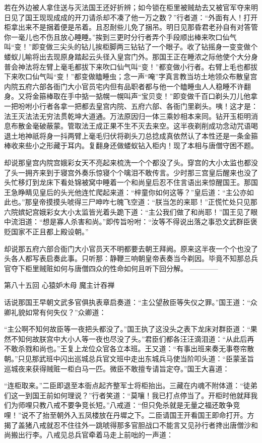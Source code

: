 \documentclass[12pt,UTF8]{ctexbook}
\begin{document}
{	若在外边被人拿住送与灭法国王还好折辨；如今锁在柜里被贼劫去又被官军夺来明日见了国王现现成成的开刀请杀却不凑了他一万之数？”行者道：“外面有人！打开柜拿出来不是捆着便是吊着。且忍耐些儿免了捆吊。明日见那昏君老孙自有对答管你一毫儿也不伤且放心睡睡。”挨到三更时分行者弄个手段顺出棒来吹口仙气叫“变！”即变做三尖头的钻儿挨柜脚两三钻钻了一个眼子。收了钻摇身一变变做个蝼蚁儿睮将出去现原身踏起云头径入皇宫门外。那国王正在睡浓之际他使个大分身普会神法将左臂上毫毛都拔下来吹口仙气叫“变！”都变做小行者。右臂上毛也都拔下来吹口仙气叫“变！”都变做瞌睡虫；念一声“唵”字真言教当坊土地领众布散皇宫内院五府六部各衙门大小官员宅内但有品职者都与他一个瞌睡虫人人稳睡不许翻身。又将金箍棒取在手中掂一掂幌一幌叫声“宝贝变！”即变做千百口剃头刀儿他拿一把吩咐小行者各拿一把都去皇宫内院、五府六部、各衙门里剃头。咦！这才是：法王灭法法无穷法贯乾坤大道通。万法原因归一体三乘妙相本来同。钻开玉柜明消息布散金毫破蔽蒙。管取法王成正果不生不灭去来空。这半夜剃削成功念动咒语喝退土地神祇将身一抖两臂上毫毛归伏将剃头刀总捻成真依然认了本性还是一条金箍棒收来些小之形藏于耳内。复翻身还做蝼蚁钻入柜内！现了本相与唐僧守困不题。
	
	却说那皇宫内院宫娥彩女天不亮起来梳洗一个个都没了头。穿宫的大小太监也都没了头一拥齐来到于寝宫外奏乐惊寝个个噙泪不敢传言。少时那三宫皇后醒来也没了头忙移灯到龙床下看处锦被窝中睡着一个和尚皇后忍不住言语出来惊醒国王。那国王急睁睛见皇后的头光他连忙爬起来道：“梓童你如何这等？”皇后道：“主公亦如此也。”那皇帝摸摸头唬得三尸呻咋七魄飞空道：“朕当怎的来耶！”正慌忙处只见那六院嫔妃宫娥彩女大小太监皆光着头跪下道：“主公我们做了和尚耶！”国王见了眼中流泪道：“想是寡人杀害和尚。”即传旨吩咐：“汝等不得说出落之事恐文武群臣褒贬国家不正且都上殿设朝。”
	
	却说那五府六部合衙门大小官员天不明都要去朝王拜阙。原来这半夜一个个也没了头各人都写表启奏此事。只听那：静鞭三响朝皇帝表奏当今剃因。毕竟不知那总兵官夺下柜里贼赃如何与唐僧四众的性命如何且听下回分解。
	------------
	
	第八十五回 心猿妒木母 魔主计吞禅
	
	话说那国王早朝文武多官俱执表章启奏道：“主公望赦臣等失仪之罪。”国王道：“众卿礼貌如常有何失仪？”众卿道：
	
	“主公啊不知何故臣等一夜把头都没了。”国王执了这没头之表下龙床对群臣道：“果然不知何故朕宫中大小人等一夜也尽没了头。”君臣们都各汪汪滴泪道：“从此后再不敢杀戮和尚也。”王复上龙位众官各立本班。王又道：“有事出班来奏无事卷帘散朝。”只见那武班中闪出巡城总兵官文班中走出东城兵马使当阶叩头道：“臣蒙圣旨巡城夜来获得贼赃一柜白马一匹。微臣不敢擅专请旨定夺。”国王大喜道：
	
	“连柜取来。”二臣即退至本衙点起齐整军士将柜抬出。三藏在内魂不附体道：“徒弟们这一到国王前如何理说？”行者笑道：“莫嚷！我已打点停当了。开柜时他就拜我们为师哩只教八戒不要争竞长短。”八戒道：“但只免杀就是无量之福还敢争竞哩！”说不了抬至朝外入五凤楼放在丹墀之下。二臣请国王开看国王即命打开。方揭了盖猪八戒就忍不住往外一跳唬得那多官胆战口不能言又见孙行者搀出唐僧沙和尚搬出行李。八戒见总兵官牵着马走上前咄的一声道：
	
}
\end{document}
